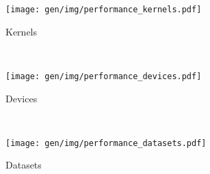 \begin{subfigure}[h]{\textwidth}
\centering
\texttt{[image: gen/img/performance\_kernels.pdf]}
\vspace{-1.5em} %
\caption{Kernels}
\label{fig:performance-kernels}
\end{subfigure}
\\
\begin{subfigure}[h]{.48\textwidth}
\centering
\texttt{[image: gen/img/performance\_devices.pdf]}
\vspace{-1.5em} %
\caption{Devices}
\label{fig:performance-devices}
\end{subfigure}
~%
\begin{subfigure}[h]{.48\textwidth}
\centering
\texttt{[image: gen/img/performance\_datasets.pdf]}
\vspace{-1.5em} %
\caption{Datasets}
\label{fig:performance-datasets}
\end{subfigure}
